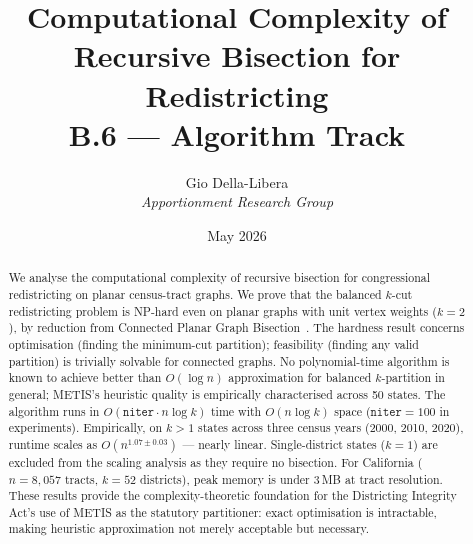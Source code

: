 \documentclass[12pt]{article}
\title{\textbf{Computational Complexity of\\Recursive Bisection for Redistricting}\\[0.4em]
\large B.6 --- Algorithm Track}
\author{Gio Della-Libera \\ \textit{Apportionment Research Group}}
\date{May 2026}
\theoremstyle{definition}
\begin{document}
\maketitle

\begin{abstract}
We analyse the computational complexity of recursive bisection for
congressional redistricting on planar census-tract graphs.
We prove that the balanced $k$-cut redistricting problem is NP-hard even
on planar graphs with unit vertex weights ($k = 2$), by reduction from
Connected Planar Graph Bisection~\citep{dyer1985partitioning}.
The hardness result concerns optimisation (finding the minimum-cut
partition); feasibility (finding any valid partition) is trivially
solvable for connected graphs.
No polynomial-time algorithm is known to achieve better than $O(\log n)$
approximation for balanced $k$-partition in general; METIS's heuristic
quality is empirically characterised across 50 states.
The algorithm runs in $O(\texttt{niter} \cdot n \log k)$ time with
$O(n \log k)$ space ($\texttt{niter} = 100$ in experiments).
Empirically, on $k > 1$ states across three census years (2000, 2010,
2020), runtime scales as $O(n^{1.07 \pm 0.03})$ --- nearly linear.
Single-district states ($k = 1$) are excluded from the scaling analysis
as they require no bisection.
For California ($n = 8{,}057$ tracts, $k = 52$ districts), peak memory
is under 3\,MB at tract resolution.
These results provide the complexity-theoretic foundation for the Districting
Integrity Act's use of METIS as the statutory partitioner: exact optimisation
is intractable, making heuristic approximation not merely acceptable but
necessary.
\end{abstract}










\end{document}
